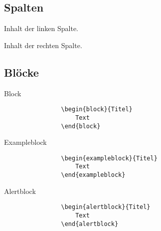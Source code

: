 	\subsection{Spalten}
	\begin{frame}{\subsecname}

		\begin{minipage}[t]{0.5\textwidth}
			\par\medskip
			Inhalt der linken Spalte.
		\end{minipage}%
		\begin{minipage}[t]{0.5\textwidth}
			\par\medskip
			Inhalt der rechten Spalte.
		\end{minipage}

	\end{frame}

	\subsection{Blöcke}
	\begin{frame}[fragile]{\subsecname}

		\begin{block}{Block}
			\begin{lstlisting}
				\begin{block}{Titel}
					Text
				\end{block}
			\end{lstlisting}
		\end{block}

		\begin{exampleblock}{Exampleblock}
			\begin{lstlisting}
				\begin{exampleblock}{Titel}
					Text
				\end{exampleblock}
			\end{lstlisting}
		\end{exampleblock}

		\begin{alertblock}{Alertblock}
			\begin{lstlisting}
				\begin{alertblock}{Titel}
					Text
				\end{alertblock}
			\end{lstlisting}
		\end{alertblock}

	\end{frame}